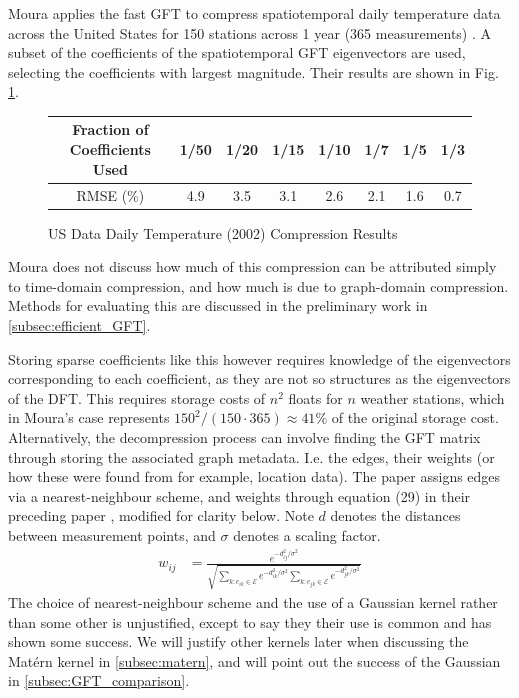 \documentclass[12pt,a4paper]{article} %
\begin{document}
Moura applies the fast GFT to compress spatiotemporal daily temperature data across the United States for 150 stations across 1 year (365 measurements) \cite{moura}. A subset of the coefficients of the spatiotemporal GFT eigenvectors are used, selecting the coefficients with largest magnitude. Their results are shown in Fig. \ref{fig:moura-results}.

\begin{figure}[!ht]
    \centering
        \begin{tabular}{|c|c|c|c|c|c|c|c|}
         \hline
         Fraction of Coefficients Used & 1/50 & 1/20 & 1/15 & 1/10 & 1/7 & 1/5 & 1/3 \\
         \hline
         RMSE (\%) & 4.9 & 3.5 & 3.1 & 2.6 & 2.1 & 1.6 & 0.7 \\
         \hline
    \end{tabular}
    \caption{US Data Daily Temperature (2002) Compression Results}
    \label{fig:moura-results}
\end{figure}
Moura does not discuss how much of this compression can be attributed simply to time-domain compression, and how much is due to graph-domain compression. Methods for evaluating this are discussed in the preliminary work in \ref{subsec:efficient_GFT}.

Storing sparse coefficients like this however requires knowledge of the eigenvectors corresponding to each coefficient, as they are not so structures as the eigenvectors of the DFT. This requires storage costs of $n^2$ floats for $n$ weather stations, which in Moura's case represents $150^2/(150\cdot365)\approx41\%$ of the original storage cost. Alternatively, the decompression process can involve finding the GFT matrix through storing the associated graph metadata. I.e. the edges, their weights (or how these were found from for example, location data). The paper assigns edges via a nearest-neighbour scheme, and weights through equation (29) in their preceding paper \cite{moura2}, modified for clarity below. Note $d$ denotes the distances between measurement points, and $\sigma$ denotes a scaling factor.
\begin{align*}
    w_{ij}&=\frac{e^{-d_{ij}^2/\sigma^2}}{\sqrt{\sum_{k:e_{ik}\in\mathcal{E}}e^{-d_{ik}^2/\sigma^2}\sum_{k:e_{jk}\in\mathcal{E}}e^{-d_{jk}^2/\sigma^2}}}
\end{align*}
The choice of nearest-neighbour scheme and the use of a Gaussian kernel rather than some other is unjustified, except to say they their use is common and has shown some success. We will justify other kernels later when discussing the Mat\'{e}rn kernel in \ref{subsec:matern}, and will point out the success of the Gaussian in \ref{subsec:GFT_comparison}.
\end{document}
